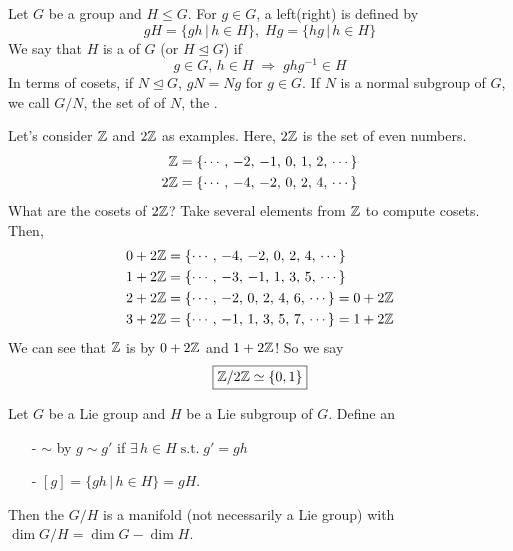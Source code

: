\documentclass[a4paper, 10pt]{article}
\begin{document}
Let $G$ be a group and $H \leq G$. For $g \in G$, a left(right)  is defined by
\[ gH = \{ gh \,|\, h \in H \}, \; Hg = \{ hg \,|\, h \in H \} \]
We say that $H$ is a  of $G$ (or $H \trianglelefteq G$) if
\[ g \in G,\, h \in H \;\Longrightarrow\; ghg^{-1} \in H \]
In terms of cosets, if $N \trianglelefteq G$, $gN = Ng$ for $g \in G$. If $N$ is a normal subgroup of $G$, we call $G/N$, the set of  of $N$, the .

\newpage


Let's consider $\mathbb{Z}$ and $2\mathbb{Z}$ as examples. Here, $2\mathbb{Z}$ is the set of even numbers.
\begin{align*}
    \mathbb{Z} &= \{ \cdots,\, -2,\, -1,\, 0,\, 1,\, 2,\, \cdots \} \\
    2\mathbb{Z} &= \{ \cdots,\, -4,\, -2,\, 0,\, 2,\, 4,\, \cdots \}
\end{align*}
What are the cosets of $2\mathbb{Z}$? Take several elements from $\mathbb{Z}$ to compute cosets. Then,
\begin{align*}
    0 + 2\mathbb{Z} &= \{ \cdots,\, -4,\, -2,\, 0,\, 2,\, 4,\, \cdots \} \\
    1 + 2\mathbb{Z} &= \{ \cdots,\, -3,\, -1,\, 1,\, 3,\, 5,\, \cdots \} \\
    2 + 2\mathbb{Z} &= \{ \cdots,\, -2,\, 0,\, 2,\, 4,\, 6,\, \cdots \} = 0 + 2\mathbb{Z} \\
    3 + 2\mathbb{Z} &= \{ \cdots,\, -1,\, 1,\, 3,\, 5,\, 7,\, \cdots \} = 1 + 2\mathbb{Z} 
\end{align*}
We can see that $\mathbb{Z}$ is  by $0 + 2\mathbb{Z}$ and $1 + 2\mathbb{Z}$! So we say
\[ \boxed{\mathbb{Z} / 2\mathbb{Z} \simeq \{0, 1\}} \]

\seprule

\begin{definition}
    Let $G$ be a Lie group and $H$ be a Lie subgroup of $G$. Define an
    \begin{itemize}
        \item[-]  $\sim$ by $g \sim g'$ if $\exists\,h\in H \;\text{s.t.}\; g'=gh$
        \item[-]  $[g] = \{ gh \,|\, h \in H \} = gH$.
    \end{itemize}
    Then the  $G/H$ is a manifold (not necessarily a Lie group) with $\dim G/H = \dim G - \dim H$.
\end{definition}
\end{document}
